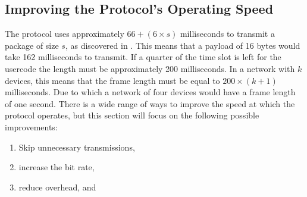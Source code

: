 \subsection{Improving the Protocol's Operating Speed}
The protocol uses approximately $66 + (6 \times s)$ milliseconds to transmit a package of size $s$, as discovered in  . 
This means that a payload of 16 bytes would take 162 milliseconds to transmit.
If a quarter of the time slot is left for the usercode the length must be approximately 200 milliseconds.
In a network with $k$ devices, this means that the frame length must be equal to $200 \times (k + 1)$ milliseconds.
Due to which a network of four devices would have a frame length of one second.
There is a wide range of ways to improve the speed at which the protocol operates, but this section will focus on the following possible improvements:
\begin{enumerate}[label=\itshape \alph*\upshape)]
    \item Skip unnecessary transmissions,
    \item increase the bit rate, 
    \item reduce overhead, and
\end{enumerate} 

